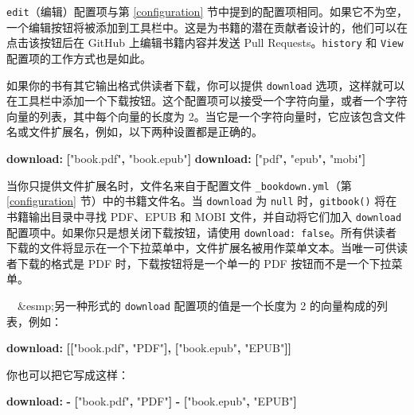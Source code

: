 \documentclass[
  12pt,
]{krantz}
\newenvironment{Shaded}{\begin{snugshade}}{\end{snugshade}}
\newcommand{\AttributeTok}[1]{\textcolor[rgb]{0.13,0.29,0.53}{#1}}
\newcommand{\FunctionTok}[1]{\textcolor[rgb]{0.13,0.29,0.53}{\textbf{#1}}}
\newcommand{\KeywordTok}[1]{\textcolor[rgb]{0.13,0.29,0.53}{\textbf{#1}}}
\newcommand{\StringTok}[1]{\textcolor[rgb]{0.31,0.60,0.02}{#1}}
\theoremstyle{definition}
\theoremstyle{definition}
\theoremstyle{definition}
\theoremstyle{definition}
\theoremstyle{remark}
\begin{document}
\texttt{edit}（编辑）配置项与第 \ref{configuration} 节中提到的配置项相同。如果它不为空，一个编辑按钮将被添加到工具栏中。这是为书籍的潜在贡献者设计的，他们可以在点击该按钮后在 GitHub 上编辑书籍内容并发送 Pull Requests。\texttt{history} 和 \texttt{View} 配置项的工作方式也是如此。

如果你的书有其它输出格式供读者下载，你可以提供 \texttt{download} 选项，这样就可以在工具栏中添加一个下载按钮。这个配置项可以接受一个字符向量，或者一个字符向量的列表，其中每个向量的长度为 2。当它是一个字符向量时，它应该包含文件名或文件扩展名，例如，以下两种设置都是正确的。

\begin{Shaded}
\begin{Highlighting}[]
\AttributeTok{    }\FunctionTok{download}\KeywordTok{:}\AttributeTok{ }\KeywordTok{[}\StringTok{"book.pdf"}\KeywordTok{,}\AttributeTok{ }\StringTok{"book.epub"}\KeywordTok{]}
\AttributeTok{    }\FunctionTok{download}\KeywordTok{:}\AttributeTok{ }\KeywordTok{[}\StringTok{"pdf"}\KeywordTok{,}\AttributeTok{ }\StringTok{"epub"}\KeywordTok{,}\AttributeTok{ }\StringTok{"mobi"}\KeywordTok{]}
\end{Highlighting}
\end{Shaded}

当你只提供文件扩展名时，文件名来自于配置文件 \texttt{\_bookdown.yml}（第 \ref{configuration} 节）中的书籍文件名。当 \texttt{download} 为 \texttt{null} 时，\texttt{gitbook()} 将在书籍输出目录中寻找 PDF、EPUB 和 MOBI 文件，并自动将它们加入 \texttt{download} 配置项中。如果你只是想关闭下载按钮，请使用 \texttt{download:\ false}。所有供读者下载的文件将显示在一个下拉菜单中，文件扩展名被用作菜单文本。当唯一可供读者下载的格式是 PDF 时，下载按钮将是一个单一的 PDF 按钮而不是一个下拉菜单。

 \&esmp;另一种形式的 \texttt{download} 配置项的值是一个长度为 2 的向量构成的列表，例如：

\begin{Shaded}
\begin{Highlighting}[]
\AttributeTok{    }\FunctionTok{download}\KeywordTok{:}\AttributeTok{ }\KeywordTok{[[}\StringTok{"book.pdf"}\KeywordTok{,}\AttributeTok{ }\StringTok{"PDF"}\KeywordTok{],}\AttributeTok{ }\KeywordTok{[}\StringTok{"book.epub"}\KeywordTok{,}\AttributeTok{ }\StringTok{"EPUB"}\KeywordTok{]]}
\end{Highlighting}
\end{Shaded}

你也可以把它写成这样：

\begin{Shaded}
\begin{Highlighting}[]
\AttributeTok{    }\FunctionTok{download}\KeywordTok{:}
\AttributeTok{      }\KeywordTok{{-}}\AttributeTok{ }\KeywordTok{[}\StringTok{"book.pdf"}\KeywordTok{,}\AttributeTok{ }\StringTok{"PDF"}\KeywordTok{]}
\AttributeTok{      }\KeywordTok{{-}}\AttributeTok{ }\KeywordTok{[}\StringTok{"book.epub"}\KeywordTok{,}\AttributeTok{ }\StringTok{"EPUB"}\KeywordTok{]}
\end{Highlighting}
\end{Shaded}
\end{document}
